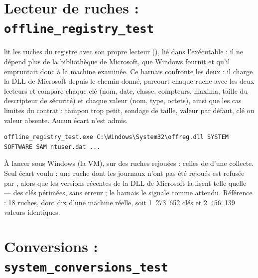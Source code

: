 \documentclass[11pt,a4paper,oneside]{report}
\begin{document}
\section{Lecteur de ruches : \texttt{offline\_registry\_test}}

\wac{} lit les ruches du registre avec son propre lecteur
(), lié dans l'exécutable : il ne dépend plus
de la bibliothèque  de Microsoft, que Windows fournit et
qu'il empruntait donc à la machine examinée. Ce harnais confronte les deux :
il charge la DLL de Microsoft depuis le chemin donné, parcourt chaque ruche
avec les deux lecteurs et compare chaque clé (nom, date, classe, compteurs,
maxima, taille du descripteur de sécurité) et chaque valeur (nom, type,
octets), ainsi que les cas limites du contrat : tampon trop petit, sondage de
taille, valeur par défaut, clé ou valeur absente. Aucun écart n'est admis.

\begin{lstlisting}
offline_registry_test.exe C:\Windows\System32\offreg.dll SYSTEM SOFTWARE SAM ntuser.dat ...
\end{lstlisting}

À lancer sous Windows (la VM), sur des ruches rejouées : celles de
 d'une collecte. Seul écart voulu : une ruche dont les
journaux n'ont pas été rejoués est refusée par \wac{}, alors que les versions
récentes de la DLL de Microsoft la lisent telle quelle — des clés périmées,
sans erreur ; le harnais le signale comme attendu. Référence : 18 ruches, dont
dix d'une machine réelle, soit 1~273~652 clés et 2~456~139 valeurs identiques.

\section{Conversions : \texttt{system\_conversions\_test}}
\end{document}
